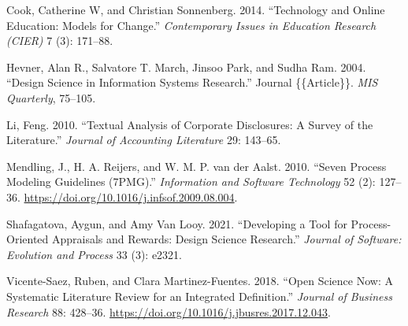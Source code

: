 \documentclass[
  letterpaper,
  DIV=11,
  numbers=noendperiod]{scrartcl}
\newlength{\cslhangindent}
\newlength{\cslentryspacingunit} %
\newenvironment{CSLReferences}[2] %
 {%
  \setlength{\parindent}{0pt}
  \ifodd #1
  \let\oldpar\par
  \def\par{\hangindent=\cslhangindent\oldpar}
  \fi
  \setlength{\parskip}{#2\cslentryspacingunit}
 }%
 {}
\begin{document}
\hypertarget{refs}{}
\begin{CSLReferences}{1}{0}
\leavevmode{}%
Cook, Catherine W, and Christian Sonnenberg. 2014. {``Technology and
Online Education: {Models} for Change.''} \emph{Contemporary Issues in
Education Research (CIER)} 7 (3): 171--88.

\leavevmode{}%
Hevner, Alan R., Salvatore T. March, Jinsoo Park, and Sudha Ram. 2004.
{``Design Science in Information Systems Research.''} Journal
\{\{Article\}\}. \emph{MIS Quarterly}, 75--105.

\leavevmode{}%
Li, Feng. 2010. {``Textual {Analysis} of {Corporate Disclosures}: {A
Survey} of the {Literature}.''} \emph{Journal of Accounting Literature}
29: 143--65.

\leavevmode{}%
Mendling, J., H. A. Reijers, and W. M. P. van der Aalst. 2010. {``Seven
Process Modeling Guidelines ({7PMG}).''} \emph{Information and Software
Technology} 52 (2): 127--36.
\url{https://doi.org/10.1016/j.infsof.2009.08.004}.

\leavevmode{}%
Shafagatova, Aygun, and Amy Van Looy. 2021. {``Developing a Tool for
Process-Oriented Appraisals and Rewards: {Design} Science Research.''}
\emph{Journal of Software: Evolution and Process} 33 (3): e2321.

\leavevmode{}%
Vicente-Saez, Ruben, and Clara Martinez-Fuentes. 2018. {``Open {Science}
Now: {A} Systematic Literature Review for an Integrated Definition.''}
\emph{Journal of Business Research} 88: 428--36.
\url{https://doi.org/10.1016/j.jbusres.2017.12.043}.

\end{CSLReferences}



\printindex \printindex[authors]
\end{document}
